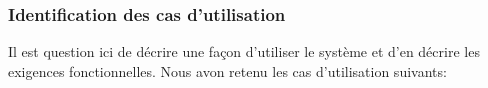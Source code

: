 \subsubsection{Identification des cas d’utilisation}
	Il est question ici de décrire une façon d’utiliser le système et d’en décrire les exigences fonctionnelles. Nous avon retenu les cas d’utilisation suivants: 

